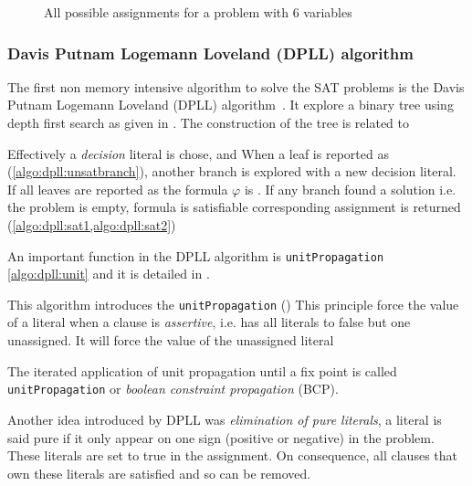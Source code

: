  
\begin{figure}[H]
	\centering
	
	\caption{All possible assignments for a problem with 6 variables}
	\label{fig:naive_algo}
\end{figure}


\subsubsection{Davis Putnam Logemann Loveland (DPLL) algorithm}

The first non memory intensive algorithm to solve the SAT problems is 
the Davis Putnam Logemann Loveland (DPLL) algorithm~\cite{dpll_62}. 
It explore a binary tree using depth first search as given in .
The construction of the tree is related to

Effectively a \emph{decision} literal is chose, and 
When a leaf is reported as \unsat (\cref{algo:dpll:unsatbranch}), another branch is 
explored with a new decision literal. If all leaves are reported as \unsat the formula
$\varphi$ is \unsat. If any branch found a solution  i.e. the problem is empty,
 formula is satisfiable corresponding assignment is returned (\cref{algo:dpll:sat1,algo:dpll:sat2})



An important function in the DPLL algorithm is \texttt{unitPropagation} \cref{algo:dpll:unit} and
it is detailed in .



This algorithm introduces the \texttt{unitPropagation} ()
This principle force the value of a literal when a clause is \emph{assertive}, i.e. 
has all literals to false but one unassigned. It will force the value of the unassigned literal 



%




The iterated application of unit propagation until a fix point is called \texttt{unitPropagation} or \emph{boolean constraint propagation } (BCP).

Another idea introduced by DPLL was \emph{elimination of pure literals},
a literal is said pure if it only appear on one sign (positive or negative) in the problem.
These literals are set to true in the assignment.
On consequence, all clauses that own these literals are satisfied and so can be removed.

